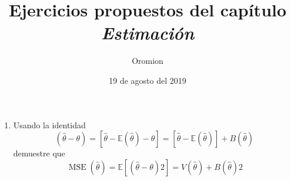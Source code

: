 \documentclass{scrartcl}
\title{Ejercicios propuestos del capítulo \emph{Estimación}}
\author{Oromion}
\date{19 de agosto del 2019}
\begin{document}

\maketitle

\section{}

\begin{enumerate}
\item Usando la identidad \[ \left(\hat{\theta}-\theta\right)=\left[\hat{\theta}-\mathds{E}\left(\hat{\theta}\right)-\theta\right]=\left[\hat{\theta}-\mathds{E}\left(\hat{\theta}\right)\right]+B\left(\hat{\theta}\right) \] demuestre que \[ \operatorname{MSE}\left(\hat{\theta}\right)=\mathds{E}\left[{\left(\hat{\theta}-\theta\right)}{2}\right]=V\left(\hat{\theta}\right)+{B\left(\hat{\theta}\right)}{2} \]
\end{enumerate}
\end{document}

